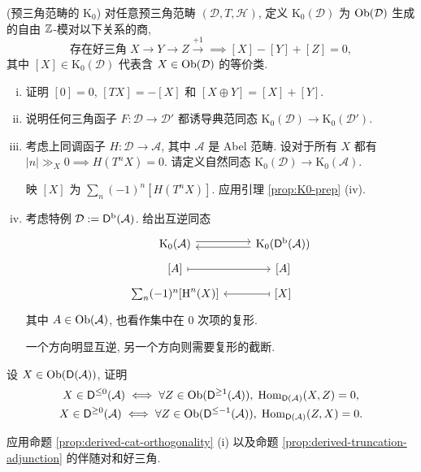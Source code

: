 \begin{Exercises}
	\item (预三角范畴的 $\mathrm{K}_0$) 对任意预三角范畴 $(\mathcal{D}, T, \mathcal{H})$, 定义 $\mathrm{K}_0(\mathcal{D})$ 为 $\operatorname{Ob}(\mathcal{D})$ 生成的自由 $\mathbb{Z}$-模对以下关系的商,
	\[ \text{存在好三角}\; X \to Y \to Z \xrightarrow{+1} \implies [X] - [Y] + [Z] = 0, \]
	其中 $[X] \in \mathrm{K}_0(\mathcal{D})$ 代表含 $X \in \operatorname{Ob}(\mathcal{D})$ 的等价类.
	\begin{enumerate}[(i)]
		\item 证明 $[0] = 0$, $[TX] = -[X]$ 和 $[X \oplus Y] = [X] + [Y]$.
		\item 说明任何三角函子 $F: \mathcal{D} \to \mathcal{D}'$ 都诱导典范同态 $\mathrm{K}_0(\mathcal{D}) \to \mathrm{K}_0(\mathcal{D}')$.
		\item 考虑上同调函子 $H: \mathcal{D} \to \mathcal{A}$, 其中 $\mathcal{A}$ 是 Abel 范畴. 设对于所有 $X$ 都有 $|n| \gg_X 0 \implies H(T^n X) = 0$. 请定义自然同态 $\mathrm{K}_0(\mathcal{D}) \to \mathrm{K}_0(\mathcal{A})$.
		
		\begin{hint}
			映 $[X]$ 为 $\sum_n (-1)^n [H(T^n X)]$. 应用引理 \ref{prop:K0-prep} (iv).
		\end{hint}
		\item 考虑特例 $\mathcal{D} := \mathsf{D}^{\mathrm{b}}(\mathcal{A})$. 给出互逆同态
		\[\begin{tikzcd}[row sep=tiny]
			\mathrm{K}_0(\mathcal{A}) \arrow[shift left, r] & \mathrm{K}_0(\cate{D}^{\bdd}(\mathcal{A})) \arrow[shift left, l] \\
			{[A]} \arrow[mapsto, r] & {[A]} \\
			\sum_n (-1)^n {[\Hm^n(X)]} & {[X]} \arrow[mapsto, l]
		\end{tikzcd}\]
		其中 $A \in \operatorname{Ob}(\mathcal{A})$, 也看作集中在 $0$ 次项的复形.
		\begin{hint}
			一个方向明显互逆, 另一个方向则需要复形的截断.
		\end{hint}
	\end{enumerate}
	 

	\item 设 $X \in \operatorname{Ob}(\mathsf{D}(\mathcal{A}))$, 证明
	\begin{gather*}
		X \in \mathsf{D}^{\leq 0}(\mathcal{A}) \iff \forall Z \in \operatorname{Ob}(\mathsf{D}^{\geq 1}(\mathcal{A})), \; \operatorname{Hom}_{\mathsf{D}(\mathcal{A})}(X, Z) = 0, \\
		X \in \mathsf{D}^{\geq 0}(\mathcal{A}) \iff \forall Z \in \operatorname{Ob}(\mathsf{D}^{\leq -1}(\mathcal{A})), \; \operatorname{Hom}_{\mathsf{D}(\mathcal{A})}(Z, X) = 0.
	\end{gather*}
	\begin{hint}
		应用命题 \ref{prop:derived-cat-orthogonality} (i) 以及命题 \ref{prop:derived-truncation-adjunction} 的伴随对和好三角. \end{hint}


\end{Exercises}
